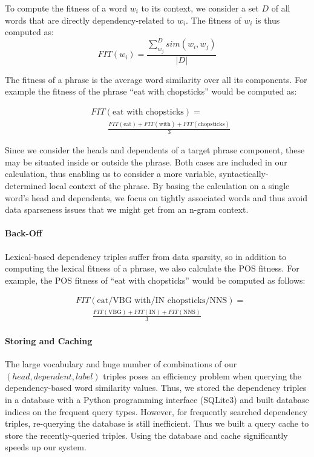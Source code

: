 \documentclass[11pt]{article}
\begin{document}
To compute the fitness of a word $w_i$ to its context, we consider a set $D$ of all words that are directly dependency-related to $w_i$. The fitness of $w_i$ is thus computed as:\\
\begin{equation}
FIT(w_i) =  \frac {  \sum_{w_j}^{D} sim(w_i,w_j) } {  |D|}
\end{equation}

The fitness of a phrase is the average word similarity over all its components. For example the fitness of the phrase ``eat with chopsticks'' would be computed as:

\begin{align}
& FIT(\mbox{eat with chopsticks}) = \nonumber \\
 & \qquad \frac{FIT(\mbox{eat}) + FIT(\mbox{with}) + FIT(\mbox{chopsticks})}{3}
\end{align}

Since we consider the heads and dependents of a target phrase component, these may be situated  inside or outside the phrase. Both cases are included in our calculation, thus enabling us to consider a more variable, syntactically-determined local context of the phrase.
By basing the calculation on a single word's head and dependents, we focus on tightly associated words and thus avoid data sparseness issues that we might get from an n-gram context.

\paragraph{Back-Off}
Lexical-based dependency triples suffer from data sparsity, so in addition to computing the lexical fitness of a phrase, we also calculate the POS fitness. For example, the POS fitness of ``eat with chopsticks'' would be computed as follows:

\begin{align}
& FIT(\mbox{eat/VBG with/IN chopsticks/NNS}) = \nonumber \\
 & \qquad \frac{FIT(\mbox{VBG}) + FIT(\mbox{IN}) + FIT(\mbox{NNS})}{3} 
\end{align}



\paragraph{Storing and Caching}
The large vocabulary and huge number of combinations of our $(head, dependent, label)$ triples poses an efficiency problem when querying the dependency-based word similarity values. Thus, we stored the dependency triples in a database with a Python programming interface (SQLite3) and built database indices on the frequent query types. However, for frequently searched dependency triples, re-querying the database is still inefficient. Thus we built a query cache to store the recently-queried triples. Using the database and cache significantly speeds up our system. 
\end{document}
